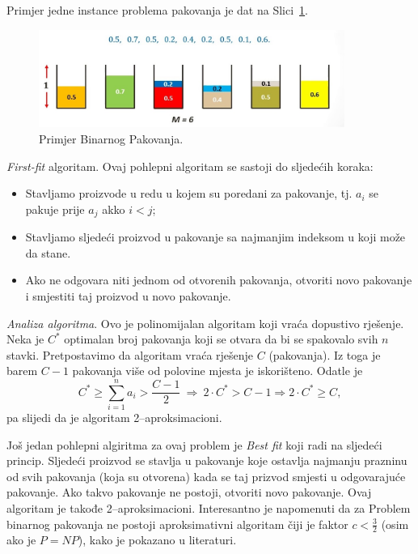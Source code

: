 \documentclass[a4paper, utf8, 11pt, colorlinks]{book}
\begin{document}
  Primjer jedne instance problema pakovanja je dat na Slici~\ref{fig:bin-packing}.

\begin{figure}[H] 
	\centering
	\includegraphics[width=100mm]{maxresdefault.eps}%
	\caption{Primjer Binarnog Pakovanja.}
    \label{fig:bin-packing}
\end{figure}
 \emph{First-fit} algoritam. Ovaj  pohlepni algoritam se sastoji do sljedećih koraka:
\begin{itemize}
	\item Stavljamo proizvode u redu u kojem su poredani za pakovanje, tj. $a_i$ se pakuje prije $a_j$ akko $i < j$;
	\item Stavljamo sljedeći proizvod u pakovanje sa najmanjim indeksom u koji može da stane. \item Ako ne odgovara niti jednom od otvorenih pakovanja, otvoriti novo pakovanje i smjestiti taj proizvod u novo pakovanje.
\end{itemize}


\noindent \emph{Analiza algoritma}. Ovo je polinomijalan algoritam koji vraća dopustivo rješenje.  Neka je $C^*$ optimalan broj pakovanja koji se otvara da bi se spakovalo svih $n$ stavki. Pretpostavimo da algoritam vraća rješenje $C$ (pakovanja). Iz toga je barem $C-1$ pakovanja više od polovine mjesta je iskorišteno. Odatle je
$$C^* \geq \sum_{i=1}^n a_i > \frac{C-1}{2}\ \Rightarrow\  2 \cdot C^* > C-1 \Rightarrow 2 \cdot C^* \geq C,$$
pa slijedi da je algoritam 2--aproksimacioni. 

 Još jedan pohlepni algiritma za ovaj problem je \emph{Best fit} koji radi na sljedeći princip. Sljedeći proizvod se stavlja u pakovanje koje ostavlja najmanju prazninu od svih pakovanja (koja su otvorena) kada se taj prizvod smjesti u odgovarajuće pakovanje. Ako takvo pakovanje ne postoji, otvoriti novo pakovanje. 
Ovaj algoritam je takođe 2--aproksimacioni. Interesantno je napomenuti da za Problem binarnog pakovanja ne postoji aproksimativni algoritam čiji je faktor $c <\frac{3}{2}$ (osim ako je $P=NP$), kako je pokazano u literaturi. 
\end{document}
